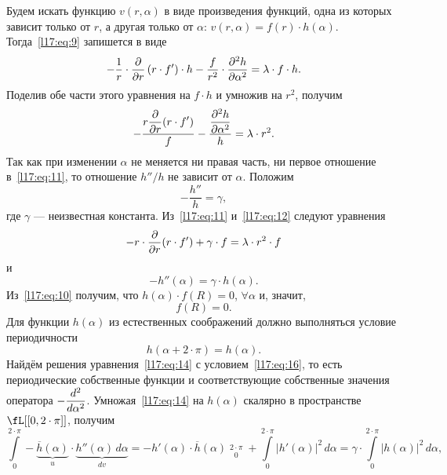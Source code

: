 Будем искать функцию $v(r,\alpha)$ в виде произведения функций, одна из которых зависит только от $r$, а другая только от $\alpha$: $v(r,\alpha)=f(r)\cdot h(\alpha)$. Тогда~\eqref{l17:eq:9} запишется в виде
\begin{equation*}
	-\frac{1}{r}\cdot\frac{\partial}{\partial r}\left(r\cdot f'\right)\cdot h-\frac{f}{r^2}\cdot\frac{\partial^2h}{\partial\alpha^2}=\lambda\cdot f\cdot h.
\end{equation*}
Поделив обе части этого уравнения на $f\cdot h$ и умножив на $r^2$, получим
\begin{equation}\label{l17:eq:11}
	-\frac{\displaystyle r\frac{\partial}{\partial r}(r\cdot f')}{f}-\frac{\displaystyle\frac{\partial^2h}{\partial\alpha^2}}{h}=\lambda\cdot r^2.
\end{equation}
Так как при изменении $\alpha$ не меняется ни правая часть, ни первое отношение в~\eqref{l17:eq:11}, то отношение $h''/h$ не зависит от $\alpha$. Положим
\begin{equation}\label{l17:eq:12}
	-\frac{h''}{h}=\gamma,
\end{equation}
где $\gamma$ --- неизвестная константа. Из~\eqref{l17:eq:11} и~\eqref{l17:eq:12} следуют уравнения 
\begin{equation}\label{l17:eq:13}
	-r\cdot\frac{\partial}{\partial r}(r\cdot f')+\gamma\cdot f=\lambda\cdot r^2\cdot f
\end{equation}
и
\begin{equation}\label{l17:eq:14}
	-h''(\alpha)=\gamma\cdot h(\alpha).
\end{equation}
Из~\eqref{l17:eq:10} получим, что $h(\alpha)\cdot f(R)=0$, $\forall\alpha$ и, значит,
\begin{equation}\label{l17:eq:15}
	 f(R)=0.
\end{equation}
Для функции $h(\alpha)$ из естественных соображений должно выполняться условие периодичности 
\begin{equation}\label{l17:eq:16}
	 h(\alpha+2\cdot\pi)=h(\alpha).
\end{equation}
Найдём решения уравнения~\eqref{l17:eq:14} с условием~\eqref{l17:eq:16}, то есть периодические собственные функции и соответствующие собственные значения оператора $-\displaystyle\frac{d^2}{d\alpha^2}$. Умножая~\eqref{l17:eq:14} на $h(\alpha)$ скалярно в пространстве $\fL[{[0,2\cdot\pi]}]$, получим 
\begin{equation*}
	\int\limits_0^{2\cdot\pi}\!-\underbrace{\overline{h}(\alpha)}_{u}\cdot \underbrace{h''(\alpha)\,d\alpha}_{dv}=-h'(\alpha)\cdot\overline{h}(\alpha)\mathop{\Big|}\limits_{0}^{2\cdot\pi}+\int\limits_{0}^{2\cdot\pi}|h'(\alpha)|^2\,d\alpha=\gamma\cdot\int\limits_{0}^{2\cdot\pi}|h(\alpha)|^2\,d\alpha,
\end{equation*}
